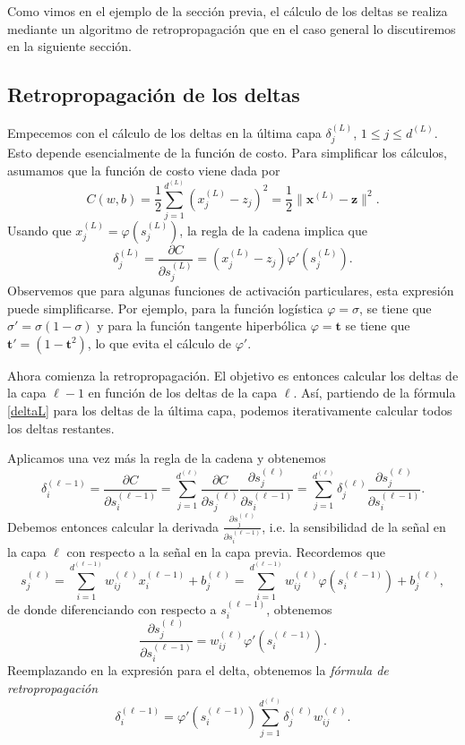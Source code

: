 \documentclass[12pt, a4paper]{amsbook}
\newcommand{\tb}{{\mathbf t}}
\newcommand{\xx}{{\mathbf x}}
\newcommand{\zz}{{\mathbf z}}
\theoremstyle{remark}
\theoremstyle{definition}
\numberwithin{section}{chapter}
\numberwithin{subsection}{section}
\numberwithin{equation}{section}
\numberwithin{figure}{chapter}
\begin{document}
Como vimos en el ejemplo de la sección previa, el cálculo de los deltas se realiza mediante un algoritmo de retropropagación que en el caso general lo discutiremos en la siguiente sección. 

\subsection{Retropropagación de los deltas}

Empecemos con el cálculo de los deltas en la última capa $\delta_j^{(L)}$, $1\le j\le d^{(L)}$. Esto depende esencialmente de la función de costo. Para simplificar los cálculos, asumamos que la función de costo viene dada por
$$
C(w, b) = \frac12 \sum_{j=1}^{d^{(L)}} (x_j^{(L)} - z_j)^2 = \frac12 \| \xx^{(L)} - \zz\|^2.
$$
Usando que $x_j^{(L)} = \varphi(s_j^{(L)})$, la regla de la cadena implica que
\begin{equation}\label{deltaL}
\delta_j^{(L)} = \frac{\partial C}{\partial s_j^{(L)}} = (x_j^{(L)}-z_j) \varphi'(s_j^{(L)}).
\end{equation}
Observemos que para algunas funciones de activación particulares, esta expresión puede simplificarse. Por ejemplo, para la función logística $\varphi=\sigma$, se tiene que $\sigma' = \sigma (1-\sigma)$ y para la función tangente hiperbólica $\varphi=\tb$ se tiene que $\tb' = (1-\tb^2)$, lo que evita el cálculo de $\varphi'$.


Ahora comienza la retropropagación. El objetivo es entonces calcular los deltas de la capa $\ell-1$ en función de los deltas de la capa $\ell$. Así, partiendo de la fórmula \eqref{deltaL} para los deltas de la última capa, podemos iterativamente calcular todos los deltas restantes.

Aplicamos una vez más la regla de la cadena y obtenemos
$$
\delta_i^{(\ell-1)} = \frac{\partial C}{\partial s_i^{(\ell-1)}} = \sum_{j=1}^{d^{(\ell)}} \frac{\partial C}{\partial s_j^{(\ell)}} \frac{\partial s_j^{(\ell)}}{\partial s_i^{(\ell-1)}} = \sum_{j=1}^{d^{(\ell)}}  \delta_j^{(\ell)}\frac{\partial s_j^{(\ell)}}{\partial s_i^{(\ell-1)}}.
$$
Debemos entonces calcular la derivada $\frac{\partial s_j^{(\ell)}}{\partial s_i^{(\ell-1)}}$, i.e. la sensibilidad de la señal en la capa $\ell$ con respecto a la señal en la capa previa. Recordemos que
$$
s_j^{(\ell)} = \sum_{i=1}^{d^{(\ell-1)}} w_{ij}^{(\ell)} x_i^{(\ell-1)} + b_j^{(\ell)} = \sum_{i=1}^{d^{(\ell-1)}} w_{ij}^{(\ell)} \varphi(s_i^{(\ell-1)}) + b_j^{(\ell)}, 
$$
de donde diferenciando con respecto a $s_i^{(\ell-1)}$, obtenemos
$$
\frac{\partial s_j^{(\ell)}}{\partial s_i^{(\ell-1)}} = w_{ij}^{(\ell)} \varphi'(s_i^{(\ell-1)}).
$$
Reemplazando en la expresión para el delta, obtenemos la {\em fórmula de retropropagación}
\begin{equation}\label{retro.delta}
\delta_i^{(\ell-1)} = \varphi'(s_i^{(\ell-1)})  \sum_{j=1}^{d^{(\ell)}}  \delta_j^{(\ell)} w_{ij}^{(\ell)}.
\end{equation}
\end{document}

